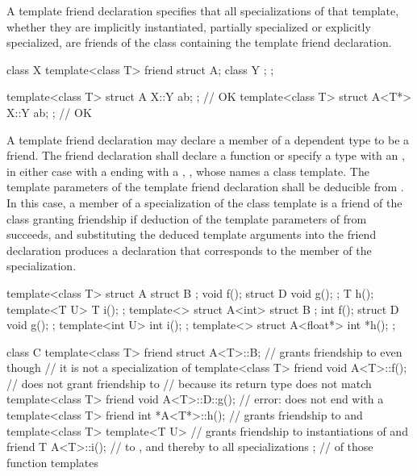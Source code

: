 \pnum
A template friend declaration specifies that all specializations of that
template, whether they are implicitly instantiated, partially
specialized or explicitly specialized,
are friends of the class containing the template friend declaration.
\begin{example}
\begin{codeblock}
class X {
  template<class T> friend struct A;
  class Y { };
};

template<class T> struct A { X::Y ab; };            // OK
template<class T> struct A<T*> { X::Y ab; };        // OK
\end{codeblock}
\end{example}

\pnum
A template friend declaration may declare
a member of a dependent type to be a friend.
The friend declaration shall declare a function or
specify a type with an ,
in either case with a 
ending with a , ,
whose  names a class template.
The template parameters of the template friend declaration
shall be deducible from .
In this case,
a member of a specialization  of the class template
is a friend of the class granting friendship
if deduction of the template parameters
of  from  succeeds, and
substituting the deduced template arguments into the friend declaration
produces a declaration that corresponds to
the member of the specialization.
\begin{example}
\begin{codeblock}
template<class T> struct A {
  struct B { };
  void f();
  struct D {
    void g();
  };
  T h();
  template<T U> T i();
};
template<> struct A<int> {
  struct B { };
  int f();
  struct D {
    void g();
  };
  template<int U> int i();
};
template<> struct A<float*> {
  int *h();
};

class C {
  template<class T> friend struct A<T>::B;      // grants friendship to  even though
                                                // it is not a specialization of 
  template<class T> friend void A<T>::f();      // does not grant friendship to 
                                                // because its return type does not match
  template<class T> friend void A<T>::D::g();   // error:  does not end with a 
  template<class T> friend int *A<T*>::h();     // grants friendship to  and 
  template<class T> template<T U>               // grants friendship to instantiations of  and
    friend T A<T>::i();                         // to , and thereby to all specializations
};                                              // of those function templates
\end{codeblock}
\end{example}

